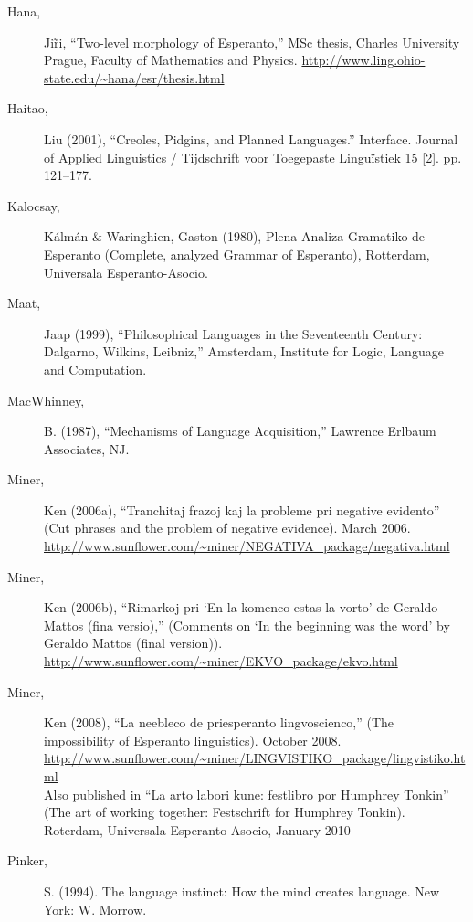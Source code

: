 \documentclass[10pt,a4paper]{article}
\begin{document}
\begin{description}
\item[Hana,] Ji\~ri, ``Two-level morphology of Esperanto,'' MSc thesis, Charles University Prague, Faculty of Mathematics and Physics.
\url{http://www.ling.ohio-state.edu/~hana/esr/thesis.html}

\item[Haitao,] Liu (2001), ``Creoles, Pidgins, and Planned Languages.'' Interface.
Journal of Applied Linguistics / Tijdschrift voor Toegepaste Linguïstiek 15 [2]. pp. 121--177.

\item[Kalocsay,] K\'alm\'an \& Waringhien, Gaston (1980), Plena Analiza Gramatiko de
Esperanto (Complete, analyzed Grammar of Esperanto), Rotterdam, Universala
Esperanto-Asocio.

\item[Maat,] Jaap (1999), ``Philosophical Languages in the Seventeenth Century:
Dalgarno, Wilkins, Leibniz,'' Amsterdam, Institute for Logic, Language and
Computation.

\item[MacWhinney,] B. (1987), ``Mechanisms of Language Acquisition,'' Lawrence Erlbaum Associates, NJ.

\item[Miner,] Ken (2006a), ``Tranchitaj frazoj kaj la probleme pri negative
evidento'' (Cut phrases and the problem of negative evidence). March 2006. \\
\url{http://www.sunflower.com/~miner/NEGATIVA_package/negativa.html}

\item[Miner,] Ken (2006b), ``Rimarkoj pri `En la komenco estas la vorto' de Geraldo
Mattos (fina versio),'' (Comments on `In the beginning was the word' by Geraldo
Mattos (final version)). \\
\url{http://www.sunflower.com/~miner/EKVO_package/ekvo.html}

\item[Miner,] Ken (2008), ``La neebleco de priesperanto lingvoscienco,'' (The
impossibility of Esperanto linguistics). October 2008. \\
\url{http://www.sunflower.com/~miner/LINGVISTIKO_package/lingvistiko.html} \\
Also published in ``La arto labori kune: festlibro por Humphrey Tonkin'' (The
art of working together: Festschrift for Humphrey Tonkin). Roterdam, Universala
Esperanto Asocio, January 2010

\item[Pinker,] S. (1994). The language instinct: How the mind creates language. New York: W. Morrow.


\end{description}
\end{document}
